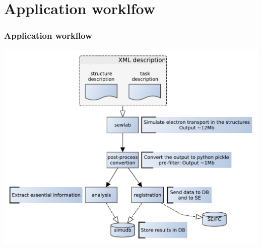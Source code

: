 \documentclass[14pt]{beamer}
\begin{document}
\section{Application worklfow}
\begin{frame}
\frametitle{Application workflow}
\centering
\includegraphics[width=\textwidth]{sewlabworkflow}
\end{frame}
\end{document}
